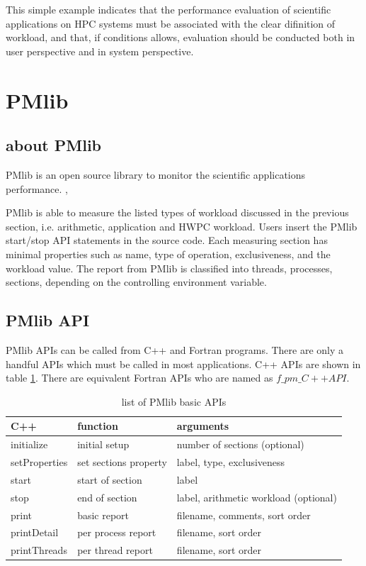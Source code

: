 \documentclass[conference]{IEEEtran}
\begin{document}
This simple example indicates that the performance evaluation of
scientific applications on HPC systems must be associated with the clear
difinition of workload, and that, if conditions allows, evaluation should be
conducted both in user perspective and in system perspective.

\section{PMlib}
\label{section:PMlib}

\subsection {about PMlib}

PMlib is an open source library to monitor the scientific applications
performance. 
\cite{PMlib:webpage-public},

PMlib is able to measure the listed types of workload discussed in the previous
section, i.e. arithmetic, application and HWPC workload.
Users insert the PMlib start/stop API statements in the source code.
Each measuring section has minimal properties such as name, type of operation,
exclusiveness, and the workload value.
The report from PMlib is classified into threads, processes, sections,
depending on the controlling environment variable.

\subsection{PMlib API}
\label{subsection:PMlib-API}

PMlib APIs can be called from C++ and Fortran programs.
There are only a handful APIs which must be called in most applications.
C++ APIs are shown in table \ref{tab:PMlib-API}. There are equivalent
Fortran APIs who are named as $ f\_pm\_{C++API} $.

\begin{table}[tb]
\scriptsize
\caption{list of PMlib basic APIs}
\label{tab:PMlib-API}
\footnotesize
\begin{tabular}{l|l|l} \hline
\scriptsize
C++	& function	&	arguments	\\ \hline
\hline
initialize	& initial setup	& number of sections (optional)	\\ \hline
setProperties	& set sections property	& label, type, exclusiveness \\ \hline
start	& start of section	& label \\ \hline
stop	& end of section	& label, arithmetic workload (optional)	\\ \hline
print	& basic report	& filename, comments, sort order	\\ \hline
\hline
printDetail	& per process report	& filename, sort order	\\ \hline
printThreads	& per thread report	& filename, sort order	\\ \hline
\end{tabular}
\end{table}
\end{document}
